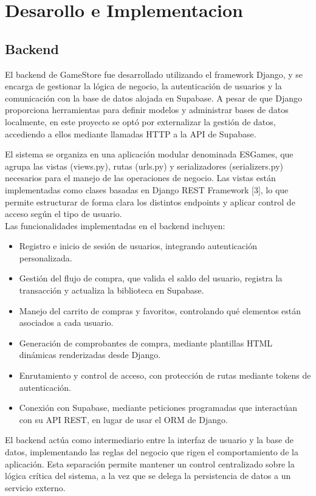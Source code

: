 \documentclass[conference]{IEEEtran}
\begin{document}
\section{Desarollo e Implementacion}

\subsection{Backend}

El backend de GameStore fue desarrollado utilizando el framework Django, y se encarga de gestionar la lógica de negocio, la autenticación de usuarios y la comunicación con la base de datos alojada en Supabase. A pesar de que Django proporciona herramientas para definir modelos y administrar bases de datos localmente, en este proyecto se optó por externalizar la gestión de datos, accediendo a ellos mediante llamadas HTTP a la API de Supabase.

El sistema se organiza en una aplicación modular denominada ESGames, que agrupa las vistas (views.py), rutas (urls.py) y serializadores (serializers.py) necesarios para el manejo de las operaciones de negocio. Las vistas están implementadas como clases basadas en Django REST Framework [3], lo que permite estructurar de forma clara los distintos endpoints y aplicar control de acceso según el tipo de usuario.\\

Las funcionalidades implementadas en el backend incluyen:
\begin{itemize}
	\item Registro e inicio de sesión de usuarios, integrando autenticación personalizada.
	\item Gestión del flujo de compra, que valida el saldo del usuario, registra la transacción y actualiza la biblioteca en Supabase.
	\item Manejo del carrito de compras y favoritos, controlando qué elementos están asociados a cada usuario.
	\item Generación de comprobantes de compra, mediante plantillas HTML dinámicas renderizadas desde Django.
	\item Enrutamiento y control de acceso, con protección de rutas mediante tokens de autenticación.
	\item Conexión con Supabase, mediante peticiones programadas que interactúan con su API REST, en lugar de usar el ORM de Django.
\end{itemize}

El backend actúa como intermediario entre la interfaz de usuario y la base de datos, implementando las reglas del negocio que rigen el comportamiento de la aplicación. Esta separación permite mantener un control centralizado sobre la lógica crítica del sistema, a la vez que se delega la persistencia de datos a un servicio externo.
\end{document}
